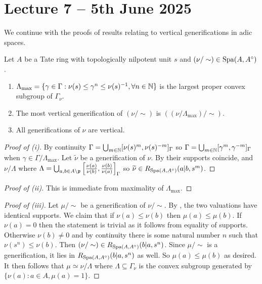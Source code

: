 \section{Lecture 7 -- 5th June 2025}\label{sec: lecture 7}
We continue with the proofs of results relating to vertical generifications in adic spaces. 
\begin{lemma}\label{lem: maximal convex subgroup}
    Let $A$ be a Tate ring with topologically nilpotent unit $s$ and $(\nu/\sim)\in\mathrm{Spa}(A,A^{\circ})$. 
    \begin{enumerate}[label=(\roman*)]
        \item $\Lambda_{\max}=\{\gamma\in\Gamma:\nu(s)\leq\gamma^{n}\leq\nu(s)^{-1},\forall n\in\mathbb{N}\}$ is the largest proper convex subgroup of $\Gamma_{\nu}$. 
        \item The most vertical generification of $(\nu/\sim)$ is $((\nu/\Lambda_{\max})/\sim)$. 
        \item All generifications of $\nu$ are vertical. 
    \end{enumerate}
\end{lemma}
\begin{proof}[Proof of (i)]
    By continuity $\Gamma=\bigcup_{m\in\mathbb{N}}[\nu(s)^{m},\nu(s)^{-m}]_{\Gamma}$ so $\Gamma=\bigcup_{m\in\mathbb{N}}[\gamma^{m},\gamma^{-m}]_{\Gamma}$ when $\gamma\in\Gamma/\Lambda_{\max}$. Let $\widetilde{\nu}$ be a generification of $\nu$. By  their supports coincide, and $\nu/\Lambda$ where $\Lambda=\bigcup_{a,b\in A\setminus\mathfrak{p}}\left[\frac{\nu(a)}{\nu(b)},\frac{\nu(b)}{\nu(a)}\right]_{\Gamma}$ so $\widetilde{\nu}\in R_{\mathrm{Spa}(A,A^{\circ})}(a|b,s^{m})$. 
\end{proof}
\begin{proof}[Proof of (ii)]
    This is immediate from maximality of $\Lambda_{\max}$. 
\end{proof}
\begin{proof}[Proof of (iii)]
    Let $\mu/\sim$ be a generification of $\nu/\sim$. By , the two valuations have identical supports. We claim that if $\nu(a)\leq\nu(b)$ then $\mu(a)\leq\mu(b)$. If $\nu(a)=0$ then the statement is trivial as it follows from equality of supports. Otherwise $\nu(b)\neq0$ and by continuity there is some natural number $n$ such that $\nu(s^{n})\leq\nu(b)$. Then $(\nu/\sim)\in R_{\mathrm{Spa}(A,A^{\circ})}(b|a,s^{n})$. Since $\mu/\sim$ is a generification, it lies in $R_{\mathrm{Spa}(A,A^{\circ})}(b|a,s^{n})$ as well. So $\mu(a)\leq\mu(b)$ as desired. It then follows that $\mu\simeq\nu/\Lambda$ where $\Lambda\subseteq\Gamma_{\nu}$ is the convex subgroup generated by $\{\nu(a):a\in A, \mu(a)=1\}$. 
\end{proof}
